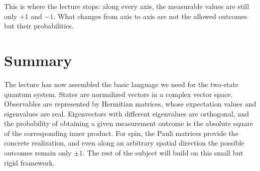 This is where the lecture stops: along every axis, the measurable values are still only \(+1\) and \(-1\). What changes from axis to axis are not the allowed outcomes but their probabilities.

\section{Summary}

The lecture has now assembled the basic language we need for the two-state quantum system. States are normalized vectors in a complex vector space. Observables are represented by Hermitian matrices, whose expectation values and eigenvalues are real. Eigenvectors with different eigenvalues are orthogonal, and the probability of obtaining a given measurement outcome is the absolute square of the corresponding inner product. For spin, the Pauli matrices provide the concrete realization, and even along an arbitrary spatial direction the possible outcomes remain only \(\pm1\). The rest of the subject will build on this small but rigid framework.